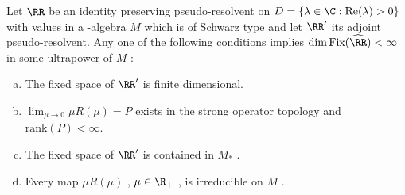 \begin{theorem}\label{thm:d4-4.4}
Let $ \RR $  be an identity preserving pseudo-resolvent on $ D = \{\lambda \in \C: \text{Re}(\lambda) > 0\} $  with values in a \WA-algebra $ M $  which is of Schwarz type and let $ \RR' $  its adjoint pseudo-resolvent.
Any one of the following conditions implies $ \dim \text{Fix}(\widehat{\RR}) < \infty $  in some ultrapower of $ M $ :

\begin{enumerate}[(a)]
\item
The fixed space of $ \RR' $  is finite dimensional.

\item
$ \lim_{\mu \to 0} \mu R(\mu) = P $  exists in the strong operator topology and $ \text{rank}(P) < \infty $.

\item
The fixed space of $ \RR' $  is contained in $ M_{*} $ .

\item
Every map $ \mu R(\mu) $ , $ \mu \in \R_{+} $ , is irreducible on $ M $ .
\end{enumerate}
\end{theorem}

